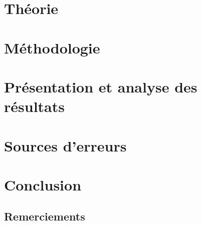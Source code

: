 \documentclass[letterpaper,12pt,oneside]{article}
\begin{document}
\section{Théorie}

\section{Méthodologie}

\section{Présentation et analyse des résultats}

\section{Sources d'erreurs}


\section{Conclusion}


\subsection*{Remerciements}




\pagebreak
\begin{appendices}
 \setcounter{page}{1}
\begin{subappendices}

\end{subappendices}
\end{appendices}
\end{document}
